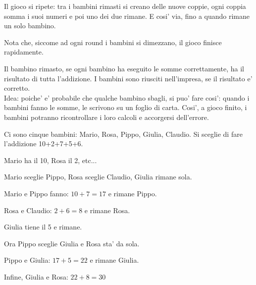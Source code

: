 \documentclass[a4paper]{article}
\begin{document}
Il gioco si ripete: tra i bambini rimasti si creano delle nuove coppie, ogni coppia somma i suoi numeri e poi uno dei due rimane.
E cosi' via, fino a quando rimane un solo bambino.

Nota che, siccome ad ogni round i bambini si dimezzano, il gioco finisce rapidamente.

Il bambino rimasto, se ogni bambino ha eseguito le somme correttamente, ha il risultato di tutta l'addizione. I bambini sono riusciti nell'impresa, se il risultato e' corretto.\\

Idea: poiche' e' probabile che qualche bambino sbagli, si puo' fare cosi': quando i bambini fanno le somme, le scrivono su un foglio di carta. Cosi', a gioco finito, i bambini potranno ricontrollare i loro calcoli e accorgersi dell'errore.

\begin{exemp}
Ci sono cinque bambini: Mario, Rosa, Pippo, Giulia, Claudio. Si sceglie di fare l'addizione 10+2+7+5+6.

Mario ha il 10, Rosa il 2, etc...

Mario sceglie Pippo, Rosa sceglie Claudio, Giulia rimane sola.

Mario e Pippo fanno: $10+7=17$ e rimane Pippo.

Rosa e Claudio: $2+6=8$ e rimane Rosa.

Giulia tiene il 5 e rimane.

Ora Pippo sceglie Giulia e Rosa sta' da sola.

Pippo e Giulia: $17+5=22$ e rimane Giulia.

Infine, Giulia e Rosa: $22+8=30$

\end{exemp}


\printindex
\end{document}
